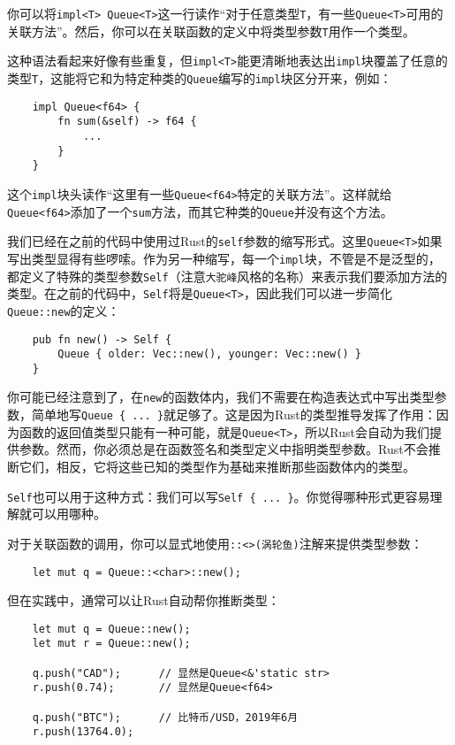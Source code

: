 你可以将\texttt{impl<T> Queue<T>}这一行读作“对于任意类型\texttt{T}，有一些\texttt{Queue<T>}可用的关联方法”。然后，你可以在关联函数的定义中将类型参数\texttt{T}用作一个类型。

这种语法看起来好像有些重复，但\texttt{impl<T>}能更清晰地表达出\texttt{impl}块覆盖了任意的类型\texttt{T}，这能将它和为特定种类的\texttt{Queue}编写的\texttt{impl}块区分开来，例如：
\begin{verbatim}
    impl Queue<f64> {
        fn sum(&self) -> f64 {
            ...
        }
    }
\end{verbatim}

这个\texttt{impl}块头读作“这里有一些\texttt{Queue<f64>}特定的关联方法”。这样就给\texttt{Queue<f64>}添加了一个\texttt{sum}方法，而其它种类的\texttt{Queue}并没有这个方法。

我们已经在之前的代码中使用过Rust的\texttt{self}参数的缩写形式。这里\texttt{Queue<T>}如果写出类型显得有些啰嗦。作为另一种缩写，每一个\texttt{impl}块，不管是不是泛型的，都定义了特殊的类型参数\texttt{Self}（注意\texttt{大驼峰}风格的名称）来表示我们要添加方法的类型。在之前的代码中，\texttt{Self}将是\texttt{Queue<T>}，因此我们可以进一步简化\texttt{Queue::new}的定义：
\begin{verbatim}
    pub fn new() -> Self {
        Queue { older: Vec::new(), younger: Vec::new() }
    }
\end{verbatim}

你可能已经注意到了，在\texttt{new}的函数体内，我们不需要在构造表达式中写出类型参数，简单地写\texttt{Queue \{ ... \}}就足够了。这是因为Rust的类型推导发挥了作用：因为函数的返回值类型只能有一种可能，就是\texttt{Queue<T>}，所以Rust会自动为我们提供参数。然而，你必须总是在函数签名和类型定义中指明类型参数。Rust不会推断它们，相反，它将这些已知的类型作为基础来推断那些函数体内的类型。

\texttt{Self}也可以用于这种方式：我们可以写\texttt{Self \{ ... \}}。你觉得哪种形式更容易理解就可以用哪种。

对于关联函数的调用，你可以显式地使用\texttt{::<>(涡轮鱼)}注解来提供类型参数：
\begin{verbatim}
    let mut q = Queue::<char>::new();
\end{verbatim}

但在实践中，通常可以让Rust自动帮你推断类型：
\begin{verbatim}
    let mut q = Queue::new();
    let mut r = Queue::new();

    q.push("CAD");      // 显然是Queue<&'static str>
    r.push(0.74);       // 显然是Queue<f64>

    q.push("BTC");      // 比特币/USD，2019年6月 
    r.push(13764.0);    
\end{verbatim}

